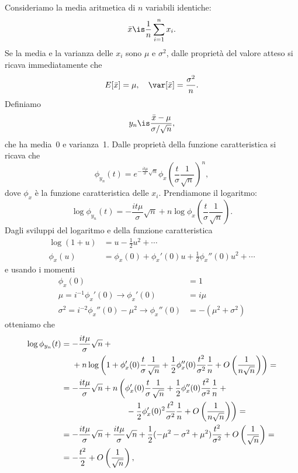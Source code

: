 
Consideriamo la media aritmetica di $n$ variabili identiche:
\begin{equation*}
	\bar x \is \frac1n \sum_{i=1}^n x_i.
\end{equation*}
Se la media e la varianza delle $x_i$ sono $\mu$ e $\sigma^2$,
dalle proprietà del valore atteso si ricava immediatamente che
\begin{equation*}
	E[\bar x] = \mu, \quad \var[\bar x] = \frac{\sigma^2}{n}.
\end{equation*}
Definiamo
\begin{equation*}
	y_n \is \frac{\bar x - \mu}{\sigma / \sqrt n},
\end{equation*}
che ha media~0 e varianza~1.
Dalle proprietà della funzione caratteristica si ricava che
\begin{equation*}
	\phi_{y_n}(t) = e^{-\frac{it\mu}{\sigma}\sqrt n} \phi_x\left(\frac t\sigma \frac1{\sqrt n}\right)^n,
\end{equation*}
dove $\phi_x$ è la funzione caratteristica delle $x_i$. Prendiamone il logaritmo:
\begin{equation*}
	\log\phi_{y_n}(t) = -\frac{it\mu}{\sigma}\sqrt n + n\log\phi_x\left(\frac t\sigma \frac1{\sqrt n}\right).
\end{equation*}
Dagli sviluppi del logaritmo e della funzione caratteristica
\begin{align*}
	\log(1+u) &= u - \frac12 u^2 + \dotsb \\
	\phi_x(u) &= \phi_x(0) + \phi_x'(0)u + \frac12 \phi_x''(0) u^2 + \dotsb
\end{align*}
e usando i momenti
\begin{align*}
	\phi_x(0) &= 1 \\
	\mu = i^{-1}\phi_x'(0) \rightarrow \phi_x'(0) &= i\mu \\
	\sigma^2 = i^{-2}\phi_x''(0) - \mu^2 \rightarrow \phi_x''(0) &= -(\mu^2+\sigma^2)
\end{align*}
otteniamo che
\begin{align*}
	\log\phi_{y_n}(t)
	&= -\frac{it\mu}{\sigma}\sqrt n + {} \\
	&\phantom{{}={}} + n \log\left(1 + \phi_x'(0) \frac t\sigma \frac1{\sqrt n}
	+ \frac12 \phi_x''(0) \frac{t^2}{\sigma^2} \frac1n
	+ O\left(\frac1{n\sqrt n}\right) \right) = \\
	&= -\frac{it\mu}{\sigma}\sqrt n
	+ n \left( \phi_x'(0) \frac t\sigma \frac1{\sqrt n}
	+ \frac12 \phi_x''(0) \frac{t^2}{\sigma^2} \frac 1n + {}\right. \\
	&\left.\phantom{= -\frac{it\mu}{\sigma}\sqrt n + n\left(\vphantom{\frac1{\sqrt n}}\right.}
	- \frac12 \phi_x'(0)^2 \frac{t^2}{\sigma^2} \frac 1n 
	+ O\left(\frac1{n\sqrt n}\right) \right) = \\
	&= -\frac{it\mu}{\sigma}\sqrt n
	+ \frac{it\mu}{\sigma}\sqrt n
	+ \frac12 (-\mu^2 - \sigma^2 + \mu^2) \frac{t^2}{\sigma^2} + O\left(\frac1{\sqrt n}\right) = \\
	&= -\frac{t^2}2 + O\left(\frac1{\sqrt n}\right),
\end{align*}
